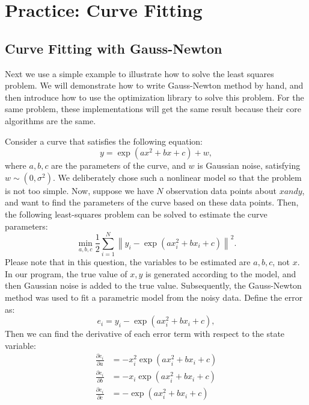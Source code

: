 \section{Practice: Curve Fitting}
\subsection{Curve Fitting with Gauss-Newton}
Next we use a simple example to illustrate how to solve the least squares problem. We will demonstrate how to write Gauss-Newton method by hand, and then introduce how to use the optimization library to solve this problem. For the same problem, these implementations will get the same result because their core algorithms are the same.

Consider a curve that satisfies the following equation:
\[
y = \exp( ax^2 + bx + c ) + w,
\]
where $a, b, c$ are the parameters of the curve, and $w$ is Gaussian noise, satisfying $w \sim (0, \sigma^2)$. We deliberately chose such a nonlinear model so that the problem is not too simple. Now, suppose we have $N$ observation data points about $x and y$, and want to find the parameters of the curve based on these data points. Then, the following least-squares problem can be solved to estimate the curve parameters:
\begin{equation}
    \min \limits_{a,b,c} \frac{1}{2}\sum\limits_{i = 1}^N {{{\left\| {{y_i} - \exp \left( {ax_i^2 + bx_i + c} \right)} \right\|}^2}} .
\end{equation}
Please note that in this question, the variables to be estimated are $a, b, c$, not $x$. In our program, the true value of $x,y$ is generated according to the model, and then Gaussian noise is added to the true value. Subsequently, the Gauss-Newton method was used to fit a parametric model from the noisy data. Define the error as:
\begin{equation}
    e_i = y_i - \exp \left( {ax_i^2 + bx_i + c} \right),
\end{equation}
Then we can find the derivative of each error term with respect to the state variable:
\begin{equation}
    \begin{aligned}
        \frac{{\partial {e_i}}}{{\partial a}} &=  - x_i^2\exp \left( {ax_i^2 + b{x_i} + c} \right)\\
        \frac{{\partial e_i}}{{\partial b}} &=  - {x_i}\exp \left( {ax_i^2 + b{x_i} + c} \right)\\
        \frac{{\partial {e_i}}}{{\partial c}} &=  - \exp \left( {ax_i^2 + b{x_i} + c} \right)
    \end{aligned}
\end{equation}
